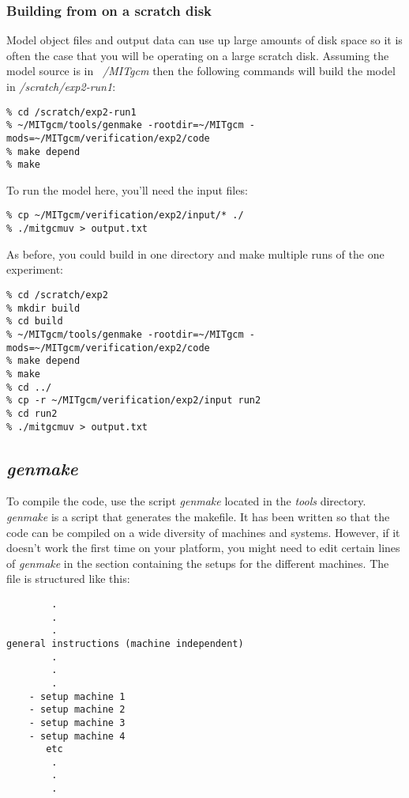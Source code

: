 \subsubsection{Building from on a scratch disk}

Model object files and output data can use up large amounts of disk
space so it is often the case that you will be operating on a large
scratch disk. Assuming the model source is in {\em ~/MITgcm} then the
following commands will build the model in {\em /scratch/exp2-run1}:
\begin{verbatim}
% cd /scratch/exp2-run1
% ~/MITgcm/tools/genmake -rootdir=~/MITgcm -mods=~/MITgcm/verification/exp2/code
% make depend
% make
\end{verbatim}
To run the model here, you'll need the input files:
\begin{verbatim}
% cp ~/MITgcm/verification/exp2/input/* ./
% ./mitgcmuv > output.txt
\end{verbatim}

As before, you could build in one directory and make multiple runs of
the one experiment:
\begin{verbatim}
% cd /scratch/exp2
% mkdir build
% cd build
% ~/MITgcm/tools/genmake -rootdir=~/MITgcm -mods=~/MITgcm/verification/exp2/code
% make depend
% make
% cd ../
% cp -r ~/MITgcm/verification/exp2/input run2
% cd run2
% ./mitgcmuv > output.txt
\end{verbatim}



\subsection{\textit{genmake}}
\label{sect:genmake}

To compile the code, use the script \textit{genmake} located in the \textit{%
tools} directory. \textit{genmake} is a script that generates the makefile.
It has been written so that the code can be compiled on a wide diversity of
machines and systems. However, if it doesn't work the first time on your
platform, you might need to edit certain lines of \textit{genmake} in the
section containing the setups for the different machines. The file is
structured like this:
\begin{verbatim}
        .
        .
        .
general instructions (machine independent)
        .
        .
        .
    - setup machine 1
    - setup machine 2
    - setup machine 3
    - setup machine 4
       etc
        .
        .
        .
\end{verbatim}

